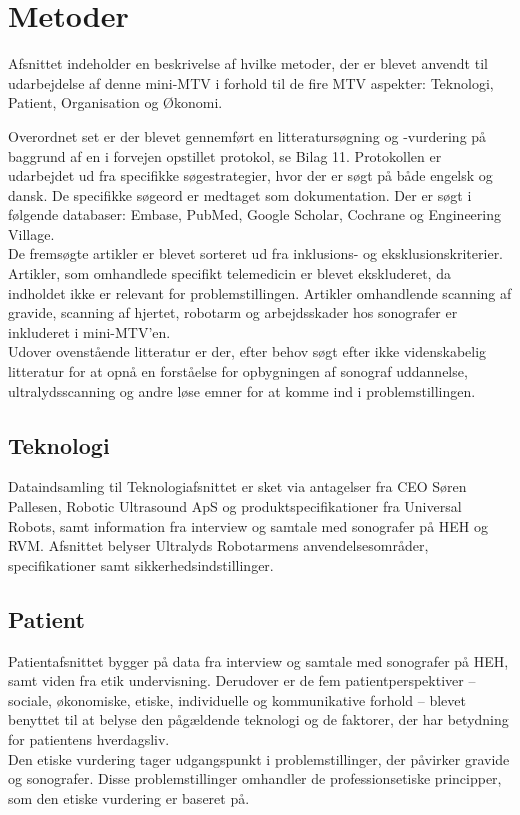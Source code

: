 \chapter{Metoder}
Afsnittet indeholder en beskrivelse af hvilke metoder, der er blevet anvendt til udarbejdelse af denne mini-MTV i forhold til de fire MTV aspekter: Teknologi, Patient, Organisation og Økonomi.

Overordnet set er der blevet gennemført en litteratursøgning og -vurdering på baggrund af en i forvejen opstillet protokol, se Bilag 11. Protokollen er udarbejdet ud fra specifikke søgestrategier, hvor der er søgt på både engelsk og dansk. De specifikke søgeord er medtaget som dokumentation. Der er søgt i følgende databaser: Embase, PubMed, Google Scholar, Cochrane og Engineering Village. \\
De fremsøgte artikler er blevet sorteret ud fra inklusions- og eksklusionskriterier. Artikler, som omhandlede specifikt telemedicin er blevet ekskluderet, da indholdet ikke er relevant for problemstillingen. Artikler omhandlende scanning af gravide, scanning af hjertet, robotarm og arbejdsskader hos sonografer er inkluderet i mini-MTV’en.\\
Udover ovenstående litteratur er der, efter behov søgt efter ikke videnskabelig litteratur for at opnå en forståelse for opbygningen af sonograf uddannelse, ultralydsscanning og andre løse emner for at komme ind i problemstillingen. 

\section{Teknologi}
Dataindsamling til Teknologiafsnittet er sket via antagelser fra CEO Søren Pallesen, Robotic Ultrasound ApS og produktspecifikationer fra Universal Robots, samt information fra interview og samtale med sonografer på HEH og RVM. Afsnittet belyser Ultralyds Robotarmens anvendelsesområder, specifikationer samt sikkerhedsindstillinger.
\section{Patient}
Patientafsnittet bygger på data fra interview og samtale med sonografer på HEH, samt viden fra etik undervisning. Derudover er de fem patientperspektiver – sociale, økonomiske, etiske, individuelle og kommunikative forhold – blevet benyttet til at belyse den pågældende teknologi og de faktorer, der har betydning for patientens hverdagsliv.\\ 
Den etiske vurdering tager udgangspunkt i problemstillinger, der påvirker gravide og sonografer. Disse problemstillinger omhandler de professionsetiske principper, som den etiske vurdering er baseret på.
